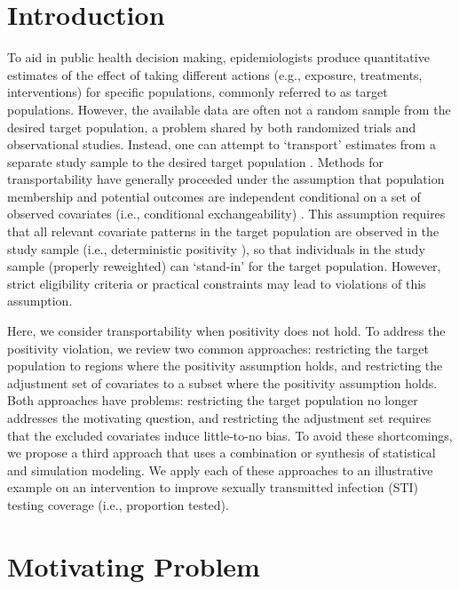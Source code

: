 \documentclass[]{article}
\begin{document}
\section*{Introduction}
To aid in public health decision making, epidemiologists produce quantitative estimates of the effect of taking different actions (e.g., exposure, treatments, interventions) for specific populations, commonly referred to as target populations. However, the available data are often not a random sample from the desired target population, a problem shared by both randomized trials and observational studies. Instead, one can attempt to `transport' estimates from a separate study sample to the desired target population \cite{westreich_transportability_2017, dahabreh_generalizing_2019, dahabreh_toward_2020, bareinboim_causal_2016, degtiar_review_2023, keiding_perils_2016, cerda_systems_2019}. Methods for transportability have generally proceeded under the assumption that population membership and potential outcomes are independent conditional on a set of observed covariates (i.e., conditional exchangeability) \cite{westreich_transportability_2017, dahabreh_generalizing_2019, dahabreh_toward_2020, degtiar_review_2023}. This assumption requires that all relevant covariate patterns in the target population are observed in the study sample (i.e., deterministic positivity \cite{zivich_positivity_2022}), so that individuals in the study sample (properly reweighted) can `stand-in' for the target population. However, strict eligibility criteria or practical constraints may lead to violations of this assumption.

Here, we consider transportability when positivity does not hold. To address the positivity violation, we review two common approaches: restricting the target population to regions where the positivity assumption holds, and restricting the adjustment set of covariates to a subset where the positivity assumption holds. Both approaches have problems: restricting the target population no longer addresses the motivating question, and restricting the adjustment set requires that the excluded covariates induce little-to-no bias. To avoid these shortcomings, we propose a third approach that uses a combination or synthesis of statistical and simulation modeling. We apply each of these approaches to an illustrative example on an intervention to improve sexually transmitted infection (STI) testing coverage (i.e., proportion tested).

\section*{Motivating Problem}
\end{document}
